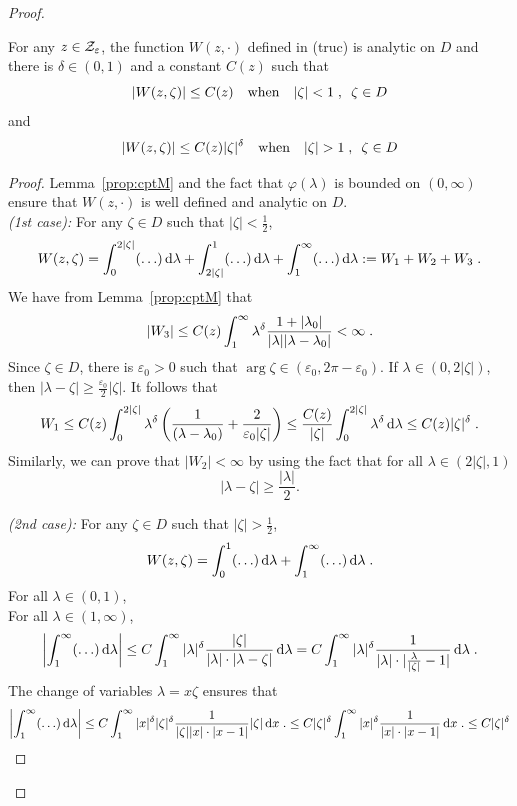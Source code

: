 \documentclass[11pt]{amsart}
\newcommand{\diff}{\,\mathrm{d}}
\begin{document}
\begin{proof}
\begin{lemma}\label{lm:cptW}For any $z \in \mathcal{Z}_\varepsilon$, the function $W(z, \cdot)$ defined in (truc) is analytic on $D$ and there is $\delta \in (0,1)$ and a constant $C(z)$ such that
    $$ |W(z, \zeta)| \leq C(z) 
    \quad \text{when} \quad |\zeta| < 1 \; , \enspace \zeta \in D$$
    and 
    $$ |W(z, \zeta)| \leq C(z)|\zeta|^\delta \quad \text{when} \quad |\zeta| > 1 \; , \enspace \zeta \in D$$
\end{lemma}
\begin{proof}Lemma~\ref{prop:cptM} and the fact that $\varphi(\lambda)$ is bounded on $(0,\infty)$ ensure that $W(z,\cdot)$ is well defined and analytic on $D$.\\

\textit{(1st case): }For any $\zeta \in D$ such that $|\zeta| < \frac{1}{2}$, 
\begin{align*}
    W(z, \zeta) = \int_0^{2|\zeta|} (\ldots)\diff \lambda + \int_{2|\zeta|}^1 (\ldots) \diff \lambda + \int_1^\infty (\ldots) \diff \lambda := W_1 + W_2 + W_3 \eqfinp
\end{align*}
We have from Lemma~\ref{prop:cptM} that
    $$ |W_3| \leq C(z) \int_1^\infty \lambda^\delta \frac{1+|\lambda_0|}{|\lambda||\lambda - \lambda_0|} < \infty \; .$$
Since $\zeta \in D$, there is $\varepsilon_0 > 0$ such that $\arg \zeta \in (\varepsilon_0, 2\pi - \varepsilon_0)$. If $\lambda \in (0, 2|\zeta|)$, then $|\lambda-\zeta| \geq \frac{\varepsilon_0}{2}|\zeta|$. It follows that 
    $$ W_1 \leq C(z)\int_0^{2|\zeta|} \lambda^\delta \left(\frac{1}{(\lambda-\lambda_0)}+ \frac{2}{\varepsilon_0 |\zeta|}\right) \leq \frac{C(z)}{|\zeta|} \int_0^{2|\zeta|} \lambda^\delta \diff \lambda \leq C(z)|\zeta|^\delta \eqfinp$$
Similarly, we can prove that $|W_2| < \infty$ by using the fact that for all $\lambda \in (2|\zeta|, 1)$ $$|\lambda-\zeta|\geq\frac{|\lambda|}{2}.$$

\textit{(2nd case):} For any $\zeta \in D$ such that $|\zeta| > \frac{1}{2}$, 
\begin{align*}
    W(z, \zeta) = \int_0^{1} (\ldots)\diff \lambda + \int_1^\infty (\ldots) \diff \lambda \eqfinp
\end{align*} 
For all $\lambda \in (0,1)$, \\
For all $\lambda \in (1, \infty)$, 
   $$\left| \int_1^\infty (\ldots) \diff \lambda \right|
   \leq C \int_1^\infty |\lambda|^\delta \frac{|\zeta|} {|\lambda|\cdot|\lambda-\zeta|} \diff \lambda  
   = C \int_1^\infty |\lambda|^\delta \frac{1} {|\lambda|\cdot|\frac{\lambda}{|\zeta|}-1|} \diff \lambda \eqfinp$$
The change of variables $\lambda = x \zeta$ ensures that 
    $$ 
    \left| \int_1^\infty (\ldots) \diff \lambda \right|
    \leq 
    C \int_1^\infty |x|^\delta |\zeta|^\delta \frac{1} {|\zeta||x|\cdot|x-1|} |\zeta|\diff x \eqfinp
    \leq 
    C |\zeta|^\delta \int_1^\infty |x|^\delta \frac{1}{|x|\cdot|x-1|}\diff x \eqfinp
    \leq C |\zeta|^\delta
    $$
\end{proof}



\end{proof}
\end{document}
